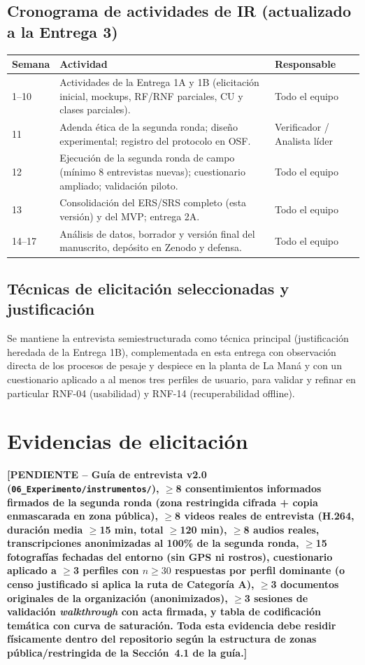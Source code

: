 \documentclass[11pt,a4paper]{article}
\newcommand{\PENDIENTE}[1]{\textcolor{pendiente}{\textbf{[PENDIENTE -- #1]}}}
\begin{document}
\subsection{Cronograma de actividades de IR (actualizado a la Entrega 3)}
\begin{longtable}{|p{1.6cm}|p{8.5cm}|p{3.5cm}|}
\hline
\textbf{Semana} & \textbf{Actividad} & \textbf{Responsable} \\
\hline
1--10 & Actividades de la Entrega 1A y 1B (elicitación inicial, mockups, RF/RNF parciales, CU y clases parciales). & Todo el equipo \\
\hline
11 & Adenda ética de la segunda ronda; diseño experimental; registro del protocolo en OSF. & Verificador / Analista líder \\
\hline
12 & Ejecución de la segunda ronda de campo (mínimo 8 entrevistas nuevas); cuestionario ampliado; validación piloto. & Todo el equipo \\
\hline
13 & Consolidación del ERS/SRS completo (esta versión) y del MVP; entrega 2A. & Todo el equipo \\
\hline
14--17 & Análisis de datos, borrador y versión final del manuscrito, depósito en Zenodo y defensa. & Todo el equipo \\
\hline
\end{longtable}

\subsection{Técnicas de elicitación seleccionadas y justificación}
Se mantiene la entrevista semiestructurada como técnica principal (justificación heredada de la Entrega 1B), complementada en esta entrega con observación directa de los procesos de pesaje y despiece en la planta de La Maná y con un cuestionario aplicado a al menos tres perfiles de usuario, para validar y refinar en particular RNF-04 (usabilidad) y RNF-14 (recuperabilidad offline).

\section{Evidencias de elicitación}
\PENDIENTE{Guía de entrevista v2.0 (\texttt{06\_Experimento/instrumentos/}), $\geq$8 consentimientos informados firmados de la segunda ronda (zona restringida cifrada + copia enmascarada en zona pública), $\geq$8 videos reales de entrevista (H.264, duración media $\geq$15 min, total $\geq$120 min), $\geq$8 audios reales, transcripciones anonimizadas al 100\% de la segunda ronda, $\geq$15 fotografías fechadas del entorno (sin GPS ni rostros), cuestionario aplicado a $\geq$3 perfiles con $n\geq30$ respuestas por perfil dominante (o censo justificado si aplica la ruta de Categoría A), $\geq$3 documentos originales de la organización (anonimizados), $\geq$3 sesiones de validación \textit{walkthrough} con acta firmada, y tabla de codificación temática con curva de saturación. Toda esta evidencia debe residir físicamente dentro del repositorio según la estructura de zonas pública/restringida de la Sección~4.1 de la guía.}
\end{document}
